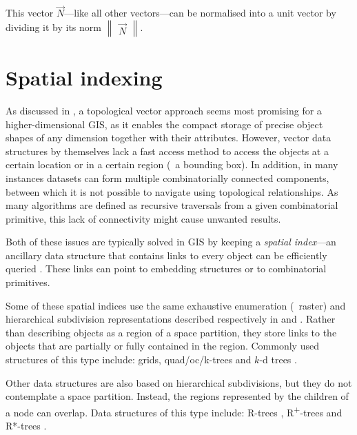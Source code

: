 This vector $\vec{N}$---like all other vectors---can be normalised into a unit vector by dividing it by its norm $\begin{Vmatrix} \vec{N} \end{Vmatrix}$.

\section{Spatial indexing}
\label{se:spatial-indexing}

As discussed in , a topological vector approach seems most promising for a higher-dimensional GIS, as it enables the compact storage of precise object shapes of any dimension together with their attributes.
However, vector data structures by themselves lack a fast access method to access the objects at a certain location or in a certain region (\eg\ a bounding box).
In addition, in many instances datasets can form multiple combinatorially connected components, between which it is not possible to navigate using topological relationships.
As many algorithms are defined as recursive traversals from a given combinatorial primitive, this lack of connectivity might cause unwanted results.

Both of these issues are typically solved in GIS by keeping a \emph{spatial index}---an ancillary data structure that contains links to every object can be efficiently queried \citep{vanOosterom99}.
These links can point to embedding structures or to combinatorial primitives.

Some of these spatial indices use the same exhaustive enumeration (\ie\ raster) and hierarchical subdivision representations described respectively in  and .
Rather than describing objects as a region of a space partition, they store links to the objects that are partially or fully contained in the region.
Commonly used structures of this type include: grids, quad/oc/k-trees \citep{Finkel74,Meagher80,Yau83,Jackins83} and $k$-d trees \citep{Bentley75}.

Other data structures are also based on hierarchical subdivisions, but they do not contemplate a space partition.
Instead, the regions represented by the children of a node can overlap.
Data structures of this type include: R-trees \citep{Guttman84}, R\textsuperscript{+}-trees \citep{Sellis87} and R*-trees \citep{Beckmann90}.

